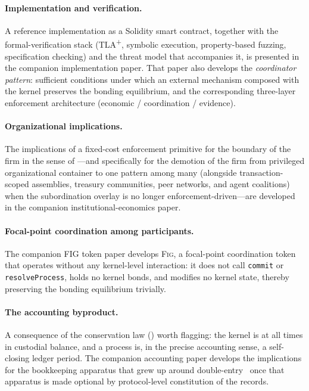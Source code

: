 \documentclass[11pt,a4paper]{article}
\theoremstyle{definition}
\theoremstyle{remark}
\begin{document}
\paragraph{Implementation and verification.}
A reference implementation as a Solidity smart contract, together
with the formal-verification stack (TLA\textsuperscript{+}, symbolic
execution, property-based fuzzing, specification checking) and the
threat model that accompanies it, is presented in the companion
implementation paper. That paper also develops the
\emph{coordinator pattern}: sufficient conditions under which an
external mechanism composed with the kernel preserves the bonding
equilibrium, and the corresponding three-layer enforcement
architecture (economic / coordination / evidence).

\paragraph{Organizational implications.}
The implications of a fixed-cost enforcement primitive for the
boundary of the firm in the sense of \citet{coase1937}---and
specifically for the demotion of the firm from privileged
organizational container to one pattern among many (alongside
transaction-scoped assemblies, treasury communities, peer
networks, and agent coalitions) when the subordination overlay
is no longer enforcement-driven---are developed in the companion
institutional-economics paper.

\paragraph{Focal-point coordination among participants.}
The companion FIG token paper develops \textsc{Fig}, a
focal-point coordination token that operates without any
kernel-level interaction: it does not call \texttt{commit} or
\texttt{resolveProcess}, holds no kernel bonds, and modifies no
kernel state, thereby preserving the bonding equilibrium trivially.

\paragraph{The accounting byproduct.}
A consequence of the conservation law ()
worth flagging: the kernel is at all times in custodial balance,
and a process is, in the precise accounting sense, a
self-closing ledger period. The companion accounting
paper develops the implications
for the bookkeeping apparatus that grew up around
double-entry~\citep{pacioli1494summa} once that apparatus is
made optional by protocol-level constitution of the records.
\end{document}
